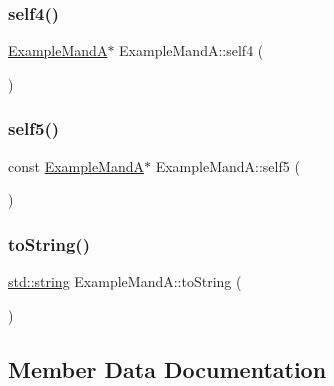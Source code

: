 \subsubsection{\texorpdfstring{self4()}{self4()}}
{\footnotesize\ttfamily \mbox{\hyperlink{class_example_mand_a}{Example\+MandA}}$\ast$ Example\+Mand\+A\+::self4 (\begin{DoxyParamCaption}{ }\end{DoxyParamCaption})\hspace{0.3cm}{\ttfamily [inline]}}

\mbox{\label{class_example_mand_a_a5b023556076ad974583ce4aaf0e81670}} 
\subsubsection{\texorpdfstring{self5()}{self5()}}
{\footnotesize\ttfamily const \mbox{\hyperlink{class_example_mand_a}{Example\+MandA}}$\ast$ Example\+Mand\+A\+::self5 (\begin{DoxyParamCaption}{ }\end{DoxyParamCaption})\hspace{0.3cm}{\ttfamily [inline]}}

\mbox{\label{class_example_mand_a_afaf84cdf0e7ea78e0dbac31f2f26feb4}} 
\subsubsection{\texorpdfstring{toString()}{toString()}}
{\footnotesize\ttfamily \mbox{\hyperlink{_s_d_l__opengl__glext_8h_ab4ccfaa8ab0e1afaae94dc96ef52dde1}{std\+::string}} Example\+Mand\+A\+::to\+String (\begin{DoxyParamCaption}{ }\end{DoxyParamCaption})\hspace{0.3cm}{\ttfamily [inline]}}



\subsection{Member Data Documentation}
\mbox{\label{class_example_mand_a_a7b5204fbe97e4e84180ae41a0016ab04}} 

